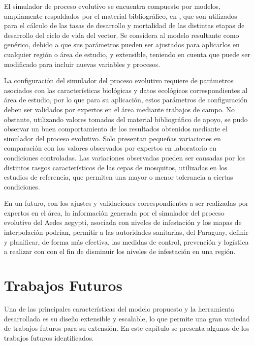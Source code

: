 El simulador de proceso evolutivo se encuentra compuesto por modelos, ampliamente respaldados por
el material bibliográfico, en \cite{sharpe1977reaction, focks1993dynamic, schoolfield1981non, otero2006stochastic, rueda1990temperature}, que son utilizados para el cálculo de las tasas de
desarrollo y mortalidad de las distintas etapas de desarrollo del ciclo de vida del vector. Se
considera al modelo resultante como genérico, debido a que sus parámetros pueden ser
ajustados para aplicarlos en cualquier región o área de estudio, y extensible, teniendo en cuenta que puede ser modificado para incluir nuevas variables y procesos.

La configuración del simulador del proceso evolutivo requiere de parámetros asociados con las
características biológicas y datos ecológicos correspondientes al área de estudio, por lo que para
su aplicación, estos parámetros de configuración deben ser validados por expertos en el área
mediante trabajos de campo. No obstante, utilizando valores tomados del material bibliográfico de
apoyo, se pudo observar un buen comportamiento de los resultados obtenidos mediante el simulador
del proceso evolutivo. Solo presentan pequeñas variaciones en comparación con los valores
observados por expertos en laboratorio en condiciones controladas. Las variaciones observadas
pueden ser causadas por los distintos rasgos característicos de las cepas de mosquitos, utilizadas
en los estudios de referencia, que permiten una mayor o menor tolerancia a ciertas condiciones.

En un futuro, con los ajustes y validaciones correspondientes a ser realizadas por expertos en el área, la información generada por el simulador del proceso evolutivo del Aedes aegypti, asociada con niveles de infestación y los mapas de interpolación podrían, permitir a las autoridades sanitarias, del Paraguay, definir y planificar, de forma más efectiva, las medidas de control, prevención y logística a realizar con con el fin de disminuir los niveles de infestación en una región.

\chapter{Trabajos Futuros}
Una de las principales características del modelo propuesto y la herramienta desarrollada es su
diseño extensible y escalable, lo que permite una gran variedad de trabajos futuros para su
extensión. En este capítulo se presenta algunos de los trabajos futuros identificados.

